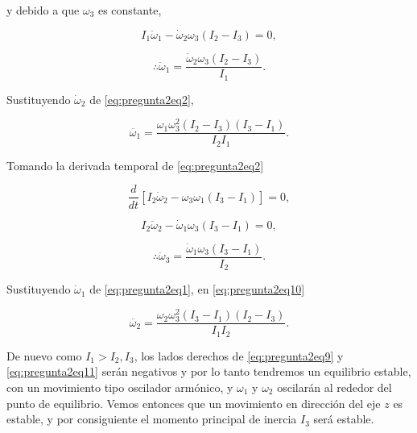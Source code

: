 \documentclass[a4paper,10pt]{article}
\numberwithin{equation}{section}
\begin{document}
y debido a que $\omega_3$ es constante, 

\begin{equation}
 I_1\ddot{\omega}_1 - \dot{\omega}_2\omega_3(I_2 - I_3) = 0,
\end{equation}

\begin{equation}
 \therefore \ddot{\omega}_1 = \frac{\dot{\omega}_2\omega_3(I_2-I_3)}{I_1}.
  \label{eq:pregunta2eq8}
\end{equation}

Sustituyendo $\dot{\omega}_2$ de \eqref{eq:pregunta2eq2}, 

\begin{equation}
 \ddot{\omega_1} = \frac{\omega_1\omega_3^2(I_2 - I_3)(I_3 - I_1)}{I_2I_1}.
 \label{eq:pregunta2eq9}
\end{equation}

Tomando la derivada temporal de \eqref{eq:pregunta2eq2} 

\begin{equation}
 \frac{d}{dt}\left[I_2\dot{\omega}_2 - \omega_3\omega_1(I_3 - I_1) \right] = 0,
\end{equation}

\begin{equation}
 I_2\ddot{\omega}_2 - \dot{\omega}_1\omega_3(I_3 - I_1) = 0,
\end{equation}

\begin{equation}
 \therefore \ddot{\omega}_3 = \frac{\dot{\omega}_1\omega_3(I_3-I_1)}{I_2}.
 \label{eq:pregunta2eq10}
\end{equation}

Sustituyendo $\dot{\omega}_1$ de \eqref{eq:pregunta2eq1}, en \eqref{eq:pregunta2eq10}

\begin{equation}
 \ddot{\omega_2} = \frac{\omega_2\omega_3^2(I_3 - I_1)(I_2- I_3)}{I_1I_2}.
 \label{eq:pregunta2eq11}
\end{equation}

De nuevo como $I_1 > I_2,I_3$, los lados derechos de \eqref{eq:pregunta2eq9} y 
\eqref{eq:pregunta2eq11} serán negativos y por lo tanto tendremos un equilibrio 
estable, con un movimiento tipo oscilador armónico, y $\omega_1$ y $\omega_2$ 
oscilarán al rededor del punto de equilibrio. Vemos entonces que un movimiento 
en dirección del eje $z$ es estable, y por consiguiente el momento principal 
de inercia $I_3$ será estable. 

\vspace{.3cm}
\end{document}
